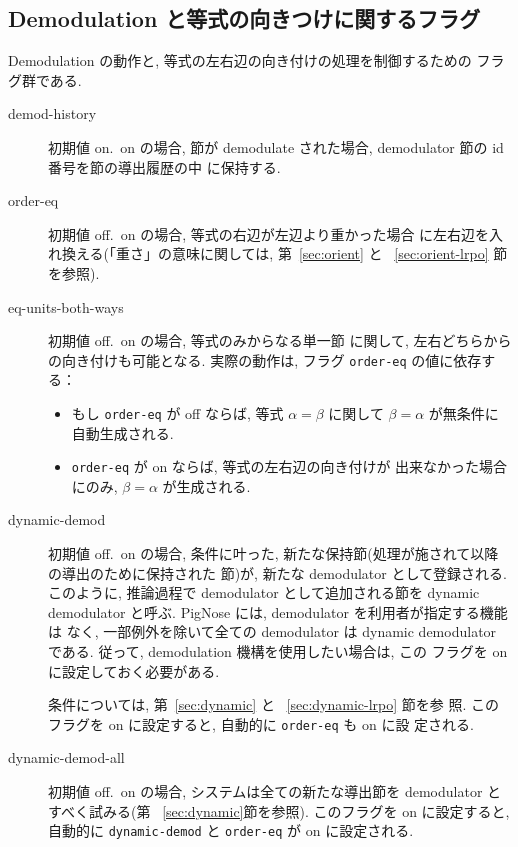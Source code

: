 \subsection{Demodulation と等式の向きつけに関するフラグ}
\label{sec:eq-flags}

Demodulation の動作と, 等式の左右辺の向き付けの処理を制御するための
フラグ群である.

\begin{description}
\item[demod-history] 初期値 on.\ on の場合,
  節が demodulate された場合, demodulator 節の id 番号を節の導出履歴の中
  に保持する. 
\item[order-eq] 初期値 off.\ on の場合, 等式の右辺が左辺より重かった場合
  に左右辺を入れ換える(「重さ」の意味に関しては, 第~\ref{sec:orient} と
  ~\ref{sec:orient-lrpo} 節を参照). 
\item[eq-units-both-ways] 初期値 off.\ on の場合, 等式のみからなる単一節
  に関して, 左右どちらからの向き付けも可能となる. 実際の動作は, フラグ
  \texttt{order-eq} の値に依存する：
  \begin{itemize}
  \item もし \texttt{order-eq} が off ならば, 等式 $\alpha=\beta$
    に関して $\beta=\alpha$ が無条件に自動生成される.
  \item \texttt{order-eq} が on ならば, 等式の左右辺の向き付けが
    出来なかった場合にのみ, $\beta=\alpha$ が生成される.
  \end{itemize}

\item[dynamic-demod] 初期値 off.\ on の場合,
  条件に叶った, 新たな保持節(処理が施されて以降の導出のために保持された
  節)が, 新たな demodulator として登録される.
  このように, 推論過程で demodulator として追加される節を dynamic
  demodulator と呼ぶ. PigNose には, demodulator を利用者が指定する機能は
  なく, 一部例外を除いて全ての demodulator は dynamic
  demodulator である. 従って, demodulation 機構を使用したい場合は, この
  フラグを on に設定しておく必要がある.

  条件については, 第~\ref{sec:dynamic} と ~\ref{sec:dynamic-lrpo} 節を参
  照. このフラグを on に設定すると, 自動的に \texttt{order-eq} も on に設
  定される. 

\item[dynamic-demod-all] 初期値 off.\ on の場合,
  システムは全ての新たな導出節を demodulator とすべく試みる(第
  ~\ref{sec:dynamic}節を参照). 
  このフラグを on に設定すると, 自動的に \texttt{dynamic-demod} と
  \texttt{order-eq} が on に設定される.


\end{description}
